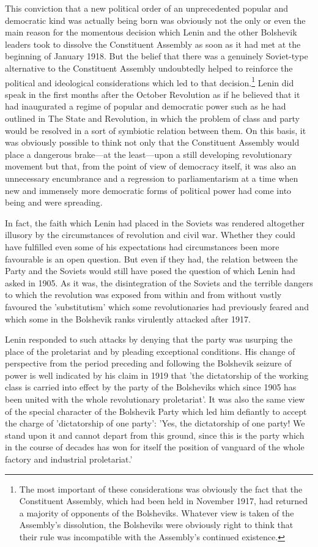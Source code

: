 This conviction that a new political order of an unprecedented popular and democratic kind was actually being born was obviously not the only or even the main reason for the momentous decision which Lenin and the other Bolshevik leaders took to dissolve the Constituent Assembly as soon as it had met at the beginning of January 1918. But the belief that there was a genuinely Soviet-type alternative to the Constituent Assembly undoubtedly helped to reinforce the political and ideological considerations which led to that decision.\footnote{The most important of these considerations was obviously the fact that the Constituent Assembly, which had been held in November 1917, had returned a majority of opponents of the Bolsheviks. Whatever view is taken of the Assembly's dissolution, the Bolsheviks were obviously right to think that their rule was incompatible with the Assembly's continued existence.} Lenin did speak in the first months after the October Revolution as if he believed that it had inaugurated a regime of popular and democratic power such as he had outlined in The State and Revolution, in which the problem of class and party would be resolved in a sort of symbiotic relation between them. On this basis, it was obviously possible to think not only that the Constituent Assembly would place a dangerous brake—at the least—upon a still developing revolutionary movement but that, from the point of view of democracy itself, it was also an unnecessary encumbrance and a regression to parliamentarism at a time when new and immensely more democratic forms of political power had come into being and were spreading.

In fact, the faith which Lenin had placed in the Soviets was rendered altogether illusory by the circumstances of revolution and civil war. Whether they could have fulfilled even some of his expectations had circumstances been more favourable is an open question. But even if they had, the relation between the Party and the Soviets would still have posed the question of which Lenin had asked in 1905. As it was, the disintegration of the Soviets and the terrible dangers to which the revolution was exposed from within and from without vastly favoured the 'substitutism' which some revolutionaries had previously feared and which some in the Bolshevik ranks virulently attacked after 1917.

Lenin responded to such attacks by denying that the party was usurping the place of the proletariat and by pleading exceptional conditions. His change of perspective from the period preceding and following the Bolshevik seizure of power is well indicated by his claim in 1919 that 'the dictatorship of the working class is carried into effect by the party of the Bolsheviks which since 1905 has been united with the whole revolutionary proletariat'. It was also the same view of the special character of the Bolshevik Party which led him defiantly to accept the charge of 'dictatorship of one party': 'Yes, the dictatorship of one party! We stand upon it and cannot depart from this ground, since this is the party which in the course of decades has won for itself the position of vanguard of the whole factory and industrial proletariat.' 

